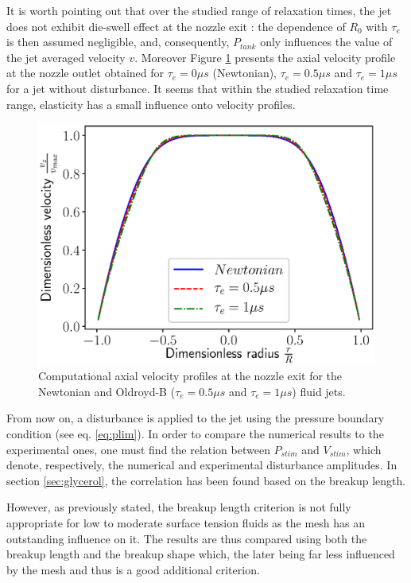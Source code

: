 \documentclass[onecolumn, 12pt]{asme2ej}
\begin{document}
It is worth pointing out that over the studied range of relaxation times, the jet does not exhibit die-swell effect at the nozzle exit : the dependence of $R_0$ with $\tau_e$ is then assumed negligible, and, consequently, $P_{tank}$ only influences the value of the jet averaged velocity $v$. Moreover Figure \ref{fig:vProfiles} presents the axial velocity profile at the nozzle outlet obtained for $\tau_e = 0\mu s$ (Newtonian), $\tau_e = 0.5\mu s$ and $\tau_e = 1\mu s$ for a jet without disturbance. It seems that within the studied relaxation time range, elasticity has a small influence onto velocity profiles.

\begin{figure}[H]
    \centering
    \includegraphics[width=15cm]{Figures/Fig13.eps}
    \caption{Computational axial velocity profiles at the nozzle exit for the Newtonian and Oldroyd-B ($\tau_e = 0.5\mu s$ and $\tau_e = 1\mu s$) fluid jets.}
    \label{fig:vProfiles}
\end{figure}

From now on, a disturbance is applied to the jet using the pressure boundary condition (see eq. \ref{eq:plim}). In order to compare the numerical results to the experimental ones, one must find the relation between $P_{stim}$ and $V_{stim}$, which denote, respectively, the numerical and experimental disturbance amplitudes. In section \ref{sec:glycerol}, the correlation has been found based on the breakup length. 

However, as previously stated, the breakup length criterion is not fully appropriate for low to moderate surface tension fluids as the mesh has an outstanding influence on it. The results are thus compared using both the breakup length and the breakup shape which, the later being far less influenced by the mesh and thus is a good additional criterion.
\end{document}
